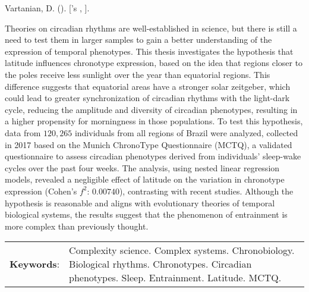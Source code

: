\begin{resumoenv}[\resumoname]
Vartanian, D. ({\imprimirdata}). \textit{\imprimirtitulo} [{\imprimirtipodetituloacademico}'s {\imprimirtipotrabalho}, {\imprimiruniversidade}].


Theories on circadian rhythms are well-established in science, but there
is still a need to test them in larger samples to gain a better
understanding of the expression of temporal phenotypes. This thesis
investigates the hypothesis that latitude influences chronotype
expression, based on the idea that regions closer to the poles receive
less sunlight over the year than equatorial regions. This difference
suggests that equatorial areas have a stronger solar zeitgeber, which
could lead to greater synchronization of circadian rhythms with the
light-dark cycle, reducing the amplitude and diversity of circadian
phenotypes, resulting in a higher propensity for morningness in those
populations. To test this hypothesis, data from \(120,265\) individuals
from all regions of Brazil were analyzed, collected in 2017 based on the
Munich ChronoType Questionnaire (MCTQ), a validated questionnaire to
assess circadian phenotypes derived from individuals' sleep-wake cycles
over the past four weeks. The analysis, using nested linear regression
models, revealed a negligible effect of latitude on the variation in
chronotype expression (Cohen's \(f^2\): \(0.00740\)), contrasting with
recent studies. Although the hypothesis is reasonable and aligns with
evolutionary theories of temporal biological systems, the results
suggest that the phenomenon of entrainment is more complex than
previously thought.


\begin{tabular}{p{2.3cm} p{13.6cm}}
  \textbf{Keywords}: & Complexity science. Complex systems. Chronobiology. Biological rhythms. Chronotypes. Circadian phenotypes. Sleep. Entrainment. Latitude. MCTQ.
\end{tabular}
\end{resumoenv}



